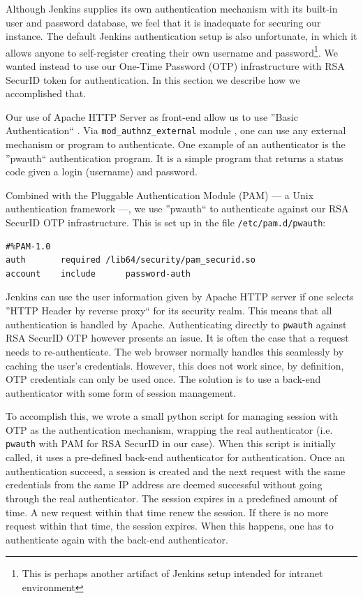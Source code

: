 \documentclass[10pt, conference, compsocconf]{IEEEtran}
\begin{document}
Although Jenkins supplies its own authentication mechanism with its built-in user and password database, we feel that it is inadequate for securing our instance. 
The default Jenkins authentication setup is also unfortunate, in which it allows anyone to self-register creating their own username and password\footnote{This is perhaps another artifact of Jenkins setup intended for intranet environment}. 
We wanted instead to use our One-Time Password (OTP) infrastructure with RSA SecurID \cite{RSASecurID} token for authentication. 
In this section we describe how we accomplished that.

Our use of Apache HTTP Server as front-end allow us to use ''Basic Authentication`` \cite{ApacheBasicAuth}. Via \texttt{mod_authnz_external} module \cite{ApacheModAuthExt}, one can use any external mechanism or program to authenticate. 
One example of an authenticator is the ''pwauth`` authentication program. 
It is a simple program that returns a status code given a login (username) and password. 

Combined with the Pluggable Authentication Module (PAM) --- a Unix authentication framework ---, we use ''pwauth`` to authenticate against our RSA SecurID OTP infrastructure. 
This is set up in the file \texttt{/etc/pam.d/pwauth}:
\begin{lstlisting}
#%PAM-1.0
auth	   required	/lib64/security/pam_securid.so
account    include      password-auth
\end{lstlisting}

Jenkins can use the user information given by Apache HTTP server if one selects ''HTTP Header by reverse proxy`` for its security realm. 
This means that all authentication is handled by Apache. 
Authenticating directly to \texttt{pwauth} against RSA SecurID OTP however presents an issue. 
It is often the case that a request needs to re-authenticate. 
The web browser normally handles this seamlessly by caching the user's credentials.
However, this does not work since, by definition, OTP credentials can only be used once. 
The solution is to use a back-end authenticator with some form of session management. 

To accomplish this, we wrote a small python script for managing session with OTP \cite{BasicAuthOTPSession} as the authentication mechanism, wrapping the real authenticator (i.e. \texttt{pwauth} with PAM for RSA SecurID in our case). 
When this script is initially called, it uses a pre-defined back-end authenticator for authentication. 
Once an authentication succeed, a session is created and the next request with the same credentials from the same IP address are deemed successful without going through the real authenticator. 
The session expires in a predefined amount of time. 
A new request within that time renew the session. 
If there is no more request within that time, the session expires.
When this happens, one has to authenticate again with the back-end authenticator. 
\end{document}
